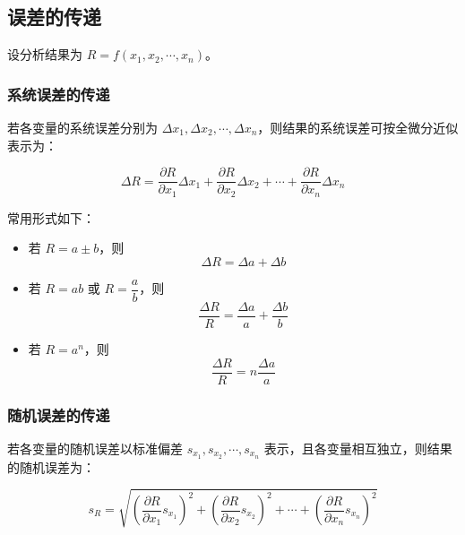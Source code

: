 \documentclass[12pt,a4paper]{article}
\numberwithin{equation}{section}
\begin{document}
\subsection{误差的传递}

设分析结果为 \(R=f(x_1,x_2,\cdots,x_n)\)。

\subsubsection{系统误差的传递}
若各变量的系统误差分别为 \(\Delta x_1,\Delta x_2,\cdots,\Delta x_n\)，则结果的系统误差可按全微分近似表示为：

\begin{equation}
\Delta R=\frac{\partial R}{\partial x_1}\Delta x_1+\frac{\partial R}{\partial x_2}\Delta x_2+\cdots+\frac{\partial R}{\partial x_n}\Delta x_n
\end{equation}

常用形式如下：
\begin{itemize}
    \item 若 \(R=a\pm b\)，则
\begin{equation}
\Delta R=\Delta a+\Delta b
\end{equation}

    \item 若 \(R=ab\) 或 \(R=\dfrac{a}{b}\)，则
\begin{equation}
\frac{\Delta R}{R}=\frac{\Delta a}{a}+\frac{\Delta b}{b}
\end{equation}

    \item 若 \(R=a^n\)，则
\begin{equation}
\frac{\Delta R}{R}=n\frac{\Delta a}{a}
\end{equation}
\end{itemize}

\subsubsection{随机误差的传递}
若各变量的随机误差以标准偏差 \(s_{x_1},s_{x_2},\cdots,s_{x_n}\) 表示，且各变量相互独立，则结果的随机误差为：

\begin{equation}
s_R=\sqrt{\left(\frac{\partial R}{\partial x_1}s_{x_1}\right)^2+\left(\frac{\partial R}{\partial x_2}s_{x_2}\right)^2+\cdots+\left(\frac{\partial R}{\partial x_n}s_{x_n}\right)^2}
\end{equation}
\end{document}
